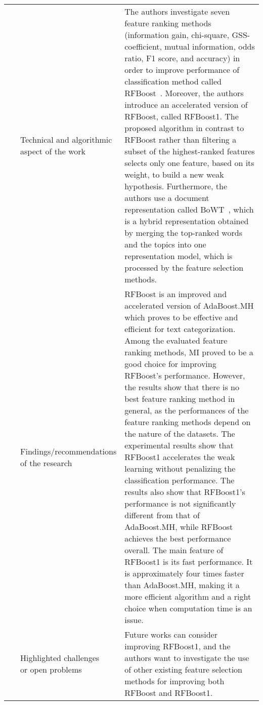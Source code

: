 \begin{landscape}
\begin{longtable}{lp{}p{}}
	\multirow{3}[0]{*}{~\citep{AlSalemi2018}} & 
    \specialcell{Technical and algorithmic \\ aspect of the work} &
	The authors investigate seven feature ranking methods (information gain, chi-square, GSS-coefficient, mutual information, odds ratio, F1 score, and accuracy) in order to improve performance of classification method called RFBoost~\cite{AlSalemi2016}. Moreover, the authors introduce an accelerated version of RFBoost, called RFBoost1. The proposed algorithm in contrast to RFBoost rather than filtering a subset of the highest-ranked features selects only one feature, based on its weight, to build a new weak hypothesis. Furthermore, the authors use a document representation called BoWT~\cite{AlSalemi2015}, which is a hybrid representation obtained by merging the top-ranked words and the topics into one representation model, which is processed by the feature selection methods.    
    \\ & 
    \specialcell{Findings/recommendations \\ of the research} & 
	RFBoost is an improved and accelerated version of AdaBoost.MH which proves to be effective and efficient for text categorization. Among the evaluated feature ranking methods, MI proved to be a good choice for improving RFBoost’s performance. However, the results show that there is no best feature ranking method in general, as the performances of the feature ranking methods depend on the nature of the datasets. The experimental results show that RFBoost1 accelerates the weak learning without penalizing the classification performance. The results also show that RFBoost1’s performance is not significantly different from that of AdaBoost.MH, while RFBoost achieves the best performance overall.  The main feature of RFBoost1 is its fast performance. It is approximately four times faster than AdaBoost.MH, making it a more efficient algorithm and a right choice when computation time is an issue.
    \\ & 
    \specialcell{Highlighted challenges \\ or open problems} & 
    Future works can consider improving RFBoost1, and the authors want to investigate the use of other existing feature selection methods for improving both RFBoost and RFBoost1.
	\\
	

\end{longtable}
\end{landscape}
